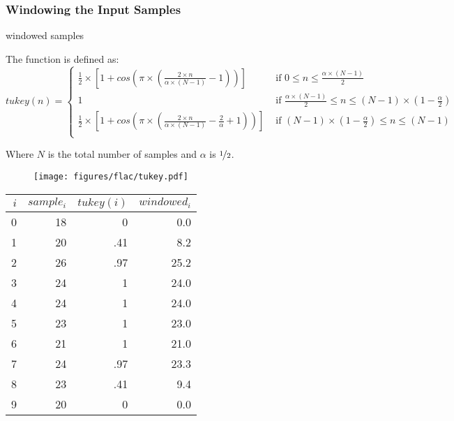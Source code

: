 \subsubsection{Windowing the Input Samples}
\Return windowed samples\;
\EALGORITHM
\par
\noindent
The  function is defined as:
\begin{equation*}
tukey(n) =
\begin{cases}
\frac{1}{2} \times \left[1 + cos\left(\pi \times \left(\frac{2 \times n}{\alpha \times (N - 1)} - 1 \right)\right)\right] & \text{ if } 0 \leq n \leq \frac{\alpha \times (N - 1)}{2} \\
1 & \text{ if } \frac{\alpha \times (N - 1)}{2} \leq n \leq (N - 1) \times (1 - \frac{\alpha}{2}) \\
\frac{1}{2} \times \left[1 + cos\left(\pi \times \left(\frac{2 \times n}{\alpha \times (N - 1)} - \frac{2}{\alpha} + 1 \right)\right)\right] & \text{ if } (N - 1) \times (1 - \frac{\alpha}{2}) \leq n \leq (N - 1) \\
\end{cases}
\end{equation*}
\par
\noindent
Where $N$ is the total number of samples and $\alpha$ is $\nicefrac{1}{2}$.
\par
\noindent
\begin{wrapfigure}[5]{r}{3in}
\texttt{[image: figures/flac/tukey.pdf]}
\end{wrapfigure}
\begin{table}[h]
\begin{tabular}{r|r|r|r}
$i$ & $sample_i$ & $tukey(i)$ & $windowed_i$ \\
\hline
0 & 18 & 0 & 0.0 \\
1 & 20 & .41 & 8.2 \\
2 & 26 & .97 & 25.2 \\
3 & 24 & 1 & 24.0 \\
4 & 24 & 1 & 24.0 \\
5 & 23 & 1 & 23.0 \\
6 & 21 & 1 & 21.0 \\
7 & 24 & .97 & 23.3 \\
8 & 23 & .41 & 9.4 \\
9 & 20 & 0 & 0.0 \\
\end{tabular}
\end{table}

